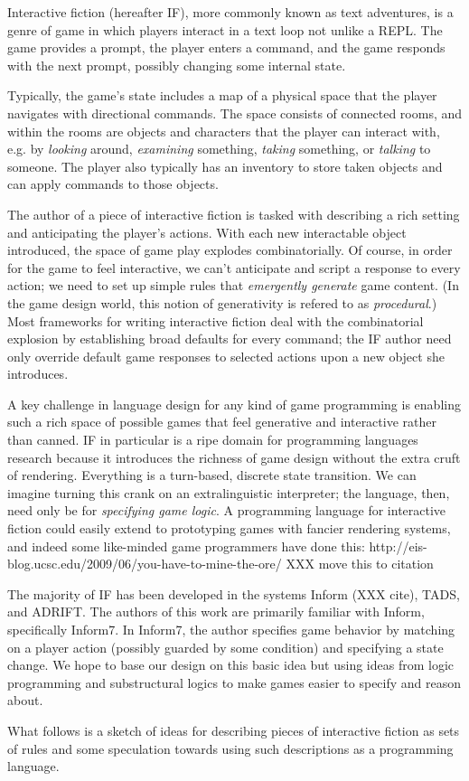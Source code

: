 Interactive fiction (hereafter IF), more commonly known as text adventures,
is a genre of game in which players interact in a text loop not unlike a
REPL. The game provides a prompt, the player enters a command, and the game
responds with the next prompt, possibly changing some internal state.

Typically, the game's state includes a map of a physical space that the
player navigates with directional commands. The space consists of connected
rooms, and within the rooms are objects and characters that the player can
interact with, e.g. by {\em looking} around, {\em examining} something, 
{\em taking} something, or {\em talking} to someone. The player also
typically has an inventory to store taken objects and can apply commands to
those objects.

The author of a piece of interactive fiction is tasked with describing a
rich setting and anticipating the player's actions.  With each new
interactable object introduced, the space of game play explodes
combinatorially. Of course, in order for the game to feel interactive, we
can't anticipate and script a response to every action; we need to set up
simple rules that {\em emergently generate} game content.  (In the game
design world, this notion of generativity is refered to as {\em
procedural}.) Most frameworks for writing interactive fiction deal with the
combinatorial explosion by establishing broad defaults for every command;
the IF author need only override default game responses to selected actions
upon a new object she introduces.

A key challenge in language design for any kind of game programming is
enabling such a rich space of possible games that feel generative and
interactive rather than canned.  IF in particular is a ripe domain for
programming languages research because it introduces the richness of game
design without the extra cruft of rendering. Everything is a turn-based,
discrete state transition. We can imagine turning this crank on an
extralinguistic interpreter; the language, then, need only be for {\em
specifying game logic}. A programming language for interactive fiction could
easily extend to prototyping games with fancier rendering systems, and
indeed some like-minded game programmers have done this:
http://eis-blog.ucsc.edu/2009/06/you-have-to-mine-the-ore/ XXX move this to
citation

The majority of IF has been developed in the systems Inform (XXX cite), TADS,
and ADRIFT. The authors of this work are primarily familiar with Inform,
specifically Inform7. In Inform7, the author specifies game behavior by
matching on a player action (possibly guarded by some condition) and
specifying a state change. We hope to base our design on this basic idea
but using ideas from logic programming and substructural logics to make
games easier to specify and reason about.

What follows is a sketch of ideas for describing pieces of interactive
fiction as sets of rules and some speculation towards using such
descriptions as a programming language.
